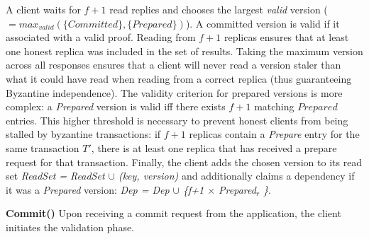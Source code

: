 A client waits for $f+1$ read replies and chooses the largest \textit{valid} version ($=max_{valid}(\{Committed\},\{Prepared\})$).
A committed version is valid if it associated with a valid proof. 
Reading from $f+1$ replicas ensures that at least one honest replica
was included in the set of results. Taking the maximum version across all responses ensures that a client will never read a version staler than what it could have read when reading from a correct replica (thus guaranteeing Byzantine independence). The validity criterion for prepared versions is more complex: a \textit{Prepared}
version is valid iff there exists $f+1$ matching $Prepared$ entries. 
 This higher threshold is necessary to prevent honest clients from being stalled by byzantine transactions: if $f+1$ replicas contain a \textit{Prepare} entry for the same transaction $T'$, there is at least one replica that has received a prepare request for that transaction. 
Finally, the client adds the chosen version to its read set \textit{ReadSet = ReadSet $\cup$ (key, version)} and additionally claims a dependency if it was a \textit{Prepared} version: \textit{Dep = Dep $\cup$ \{f+1 $\times$ Prepared$_r$ \}}. 

\par \textbf{Commit()} Upon receiving a commit request from the application, the client initiates the validation phase. 

